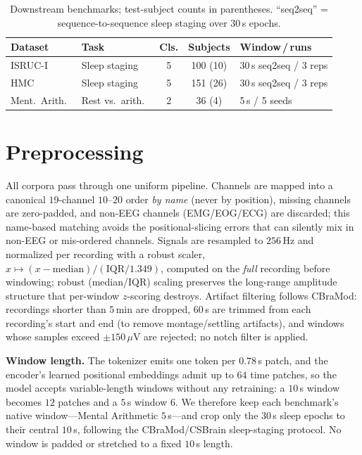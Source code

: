 \documentclass[letterpaper]{article}
\begin{document}
\begin{table}[t]\centering\footnotesize
\setlength{\tabcolsep}{6pt}
\caption{Downstream benchmarks; test-subject counts in parentheses. ``seq2seq'' =
sequence-to-sequence sleep staging over $30$\,s epochs.}
\label{tab:app_data}
\begin{tabular}{llccl}
\toprule
Dataset & Task & Cls. & Subjects & Window\,/\,runs\\
\midrule
ISRUC-I \cite{khalighi2016isruc}          & Sleep staging & 5 & 100 (10) & 30\,s seq2seq / 3 reps\\
HMC \cite{alvarez2021hmc}                 & Sleep staging & 5 & 151 (26) & 30\,s seq2seq / 3 reps\\
Ment.\ Arith.\ \cite{zyma2019mentalarith} & Rest vs.\ arith.\ & 2 & 36 (4) & 5\,s / 5 seeds\\
\bottomrule
\end{tabular}
\end{table}

\section{Preprocessing}\label{app:preproc}
All corpora pass through one uniform pipeline. Channels are mapped into a canonical
$19$-channel $10$--$20$ order \emph{by name} (never by position), missing channels
are zero-padded, and non-EEG channels (EMG/EOG/ECG) are discarded; this name-based
matching avoids the positional-slicing errors that can silently mix in non-EEG or
mis-ordered channels. Signals are resampled to $256$\,Hz and normalized per
recording with a robust scaler, $x\mapsto(x-\mathrm{median})/(\mathrm{IQR}/1.349)$,
computed on the \emph{full} recording before windowing; robust (median/IQR) scaling
preserves the long-range amplitude structure that per-window $z$-scoring destroys.
Artifact filtering follows CBraMod: recordings shorter than $5$\,min are dropped,
$60$\,s are trimmed from each recording's start and end (to remove
montage/settling artifacts), and windows whose samples exceed $\pm150\,\mu$V are
rejected; no notch filter is applied.

\noindent\textbf{Window length.} The tokenizer emits one token per $0.78$\,s patch,
and the encoder's learned positional embeddings admit up to $64$ time patches, so the
model accepts variable-length windows without any retraining: a $10$\,s window
becomes $12$ patches and a $5$\,s window $6$. We therefore keep each benchmark's
native window---Mental Arithmetic $5$\,s---and crop only the $30$\,s
sleep epochs to their central $10$\,s, following the CBraMod/CSBrain sleep-staging
protocol. No window is padded or stretched to a fixed $10$\,s length.
\end{document}
